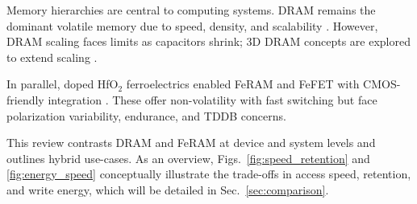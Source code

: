 
Memory hierarchies are central to computing systems. 
DRAM remains the dominant volatile memory due to speed, density, and scalability \cite{choi2022,kim2021_dram}. 
However, DRAM scaling faces limits as capacitors shrink; 3D DRAM concepts are explored to extend scaling \cite{iedm2023_dram}.

In parallel, doped HfO$_2$ ferroelectrics enabled FeRAM and FeFET with CMOS-friendly integration \cite{boscke2011,mueller2012}. 
These offer non-volatility with fast switching but face polarization variability, endurance, and TDDB concerns. 

This review contrasts DRAM and FeRAM at device and system levels and outlines hybrid use-cases. 
As an overview, Figs.~\ref{fig:speed_retention} and \ref{fig:energy_speed} conceptually illustrate the trade-offs in access speed, retention, and write energy, which will be detailed in Sec.~\ref{sec:comparison}.
